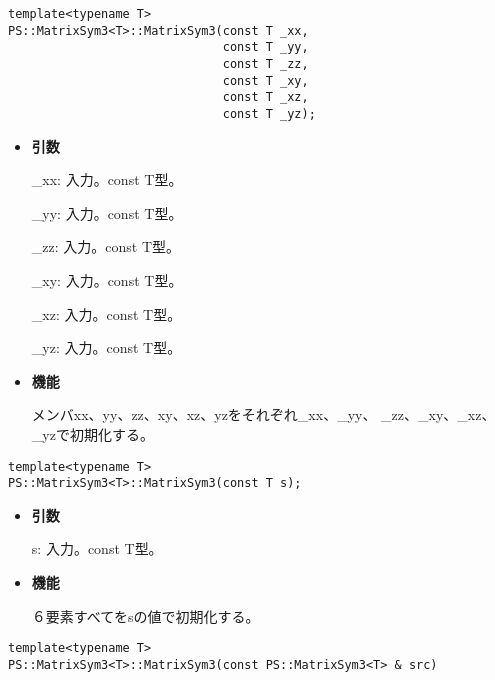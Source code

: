 \begin{screen}
\begin{verbatim}
template<typename T>
PS::MatrixSym3<T>::MatrixSym3(const T _xx,
                              const T _yy,
                              const T _zz,
                              const T _xy,
                              const T _xz,
                              const T _yz);
\end{verbatim}
\end{screen}

\begin{itemize}

\item{{\bf 引数}}

{\_xx}: 入力。{const T}型。

{\_yy}: 入力。{const T}型。

{\_zz}: 入力。{const T}型。

{\_xy}: 入力。{const T}型。

{\_xz}: 入力。{const T}型。

{\_yz}: 入力。{const T}型。

\item{{\bf 機能}}

メンバ{xx}、{yy}、{zz}、{xy}、{xz}、{yz}をそれぞれ{\_xx}、{\_yy}、
{\_zz}、{\_xy}、{\_xz}、{\_yz}で初期化する。

\end{itemize}

\begin{screen}
\begin{verbatim}
template<typename T>
PS::MatrixSym3<T>::MatrixSym3(const T s);
\end{verbatim}
\end{screen}

\begin{itemize}

\item{{\bf 引数}}

{s}: 入力。{const T}型。

\item{{\bf 機能}}

６要素すべてを{s}の値で初期化する。

\end{itemize}


\begin{screen}
\begin{verbatim}
template<typename T>
PS::MatrixSym3<T>::MatrixSym3(const PS::MatrixSym3<T> & src)
\end{verbatim}
\end{screen}

